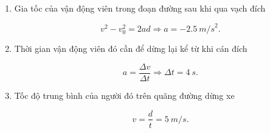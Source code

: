 \begin{enumerate}[label=\bfseries Bài \arabic*:]
	\hideall
	{	
		\begin{enumerate}[label=\alph*)]
			\item Gia tốc của vận động viên trong đoạn đường sau khi qua vạch đích
			
			$$v^2 - v_0^2 = 2ad \Rightarrow a = -\SI{2,5}{m/s}^2.$$
			
			\item Thời gian vận động viên đó cần để dừng lại kể từ khi cán đích
			
			$$a = \dfrac{\Delta v}{\Delta t} \Rightarrow  \Delta t = \SI{4}{s}.$$
			
			\item Tốc độ trung bình của người đó trên quãng đường dừng xe
			
			$$v = \dfrac{d}{t} = \SI{5}{m/s}.$$
		\end{enumerate}
	}
\end{enumerate}
